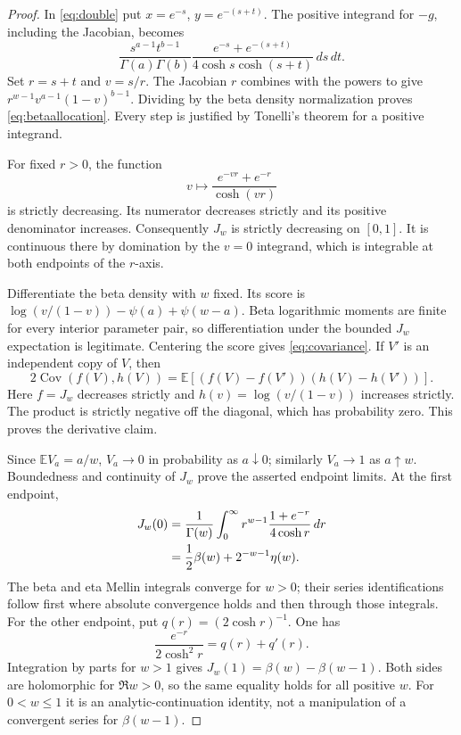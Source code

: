 \begin{proof}
In \eqref{eq:double} put $x=e^{-s}$, $y=e^{-(s+t)}$. The positive
integrand for $-g$, including the Jacobian, becomes
\[
 \frac{s^{a-1}t^{b-1}}{\Gamma(a)\Gamma(b)}
 \frac{e^{-s}+e^{-(s+t)}}{4\cosh s\cosh(s+t)}\,ds\,dt.
\]
Set $r=s+t$ and $v=s/r$. The Jacobian $r$ combines with the powers
to give $r^{w-1}v^{a-1}(1-v)^{b-1}$. Dividing by the beta density
normalization proves \eqref{eq:betaallocation}. Every step is justified
by Tonelli's theorem for a positive integrand.

For fixed $r>0$, the function
\[
 v\longmapsto\frac{e^{-vr}+e^{-r}}{\cosh(vr)}
\]
is strictly decreasing. Its numerator decreases strictly and its
positive denominator increases. Consequently $J_w$ is strictly
decreasing on $[0,1]$. It is continuous there by domination by the
$v=0$ integrand, which is integrable at both endpoints of the $r$-axis.

Differentiate the beta density with $w$ fixed. Its score is
$\log(v/(1-v))-\psi(a)+\psi(w-a)$. Beta logarithmic moments are finite
for every interior parameter pair, so differentiation under the
bounded $J_w$ expectation is legitimate. Centering the score gives
\eqref{eq:covariance}. If $V'$ is an independent copy of $V$, then
\[
 2\operatorname{Cov}(f(V),h(V))
 =\mathbb E[(f(V)-f(V'))(h(V)-h(V'))].
\]
Here $f=J_w$ decreases strictly and $h(v)=\log(v/(1-v))$ increases
strictly. The product is strictly negative off the diagonal, which has
probability zero. This proves the derivative claim.

Since $\mathbb E V_a=a/w$, $V_a\to0$ in probability as $a\downarrow0$;
similarly $V_a\to1$ as $a\uparrow w$. Boundedness and continuity of
$J_w$ prove the asserted endpoint limits. At the first endpoint,
\begin{align}
 J_w(0)
 &=\frac1{\Gamma(w)}\int_0^\infty
 r^{w-1}\frac{1+e^{-r}}{4\cosh r}\,dr\notag\\
 &=\frac12\beta(w)+2^{-w-1}\eta(w).\label{eq:J0}
\end{align}
The beta and eta Mellin integrals converge for $w>0$; their series
identifications follow first where absolute convergence holds and then
through those integrals. For the other endpoint, put
$q(r)=(2\cosh r)^{-1}$. One has
\[
 \frac{e^{-r}}{2\cosh^2r}=q(r)+q'(r).
\]
Integration by parts for $w>1$ gives
$J_w(1)=\beta(w)-\beta(w-1)$. Both sides are holomorphic for
$\Re w>0$, so the same equality holds for all positive $w$.
For $0<w\le1$ it is an analytic-continuation identity, not a manipulation
of a convergent series for $\beta(w-1)$.
\end{proof}

